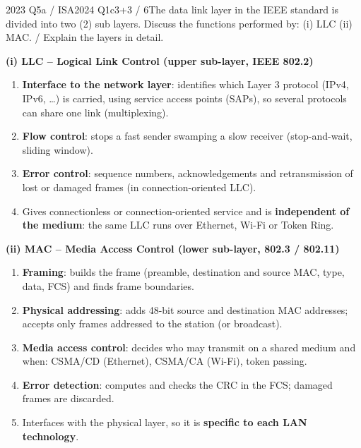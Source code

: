 \documentclass[10pt]{article}
\begin{document}
\begin{pastq}{2023 Q5a \textnormal{/} ISA2024 Q1c}{3+3 / 6}The data link layer in the IEEE standard is divided into two (2) sub layers. Discuss the functions performed by: (i) LLC (ii) MAC. / Explain the layers in detail.\end{pastq}
\begin{ans}
\textbf{(i) LLC -- Logical Link Control (upper sub-layer, IEEE 802.2)}
\begin{enumerate}
\item \textbf{Interface to the network layer}: identifies which Layer 3 protocol (IPv4, IPv6, \dots) is carried, using service access points (SAPs), so several protocols can share one link (multiplexing).
\item \textbf{Flow control}: stops a fast sender swamping a slow receiver (stop-and-wait, sliding window).
\item \textbf{Error control}: sequence numbers, acknowledgements and retransmission of lost or damaged frames (in connection-oriented LLC).
\item Gives connectionless or connection-oriented service and is \textbf{independent of the medium}: the same LLC runs over Ethernet, Wi-Fi or Token Ring.
\end{enumerate}
\textbf{(ii) MAC -- Media Access Control (lower sub-layer, 802.3 / 802.11)}
\begin{enumerate}
\item \textbf{Framing}: builds the frame (preamble, destination and source MAC, type, data, FCS) and finds frame boundaries.
\item \textbf{Physical addressing}: adds 48-bit source and destination MAC addresses; accepts only frames addressed to the station (or broadcast).
\item \textbf{Media access control}: decides who may transmit on a shared medium and when: CSMA/CD (Ethernet), CSMA/CA (Wi-Fi), token passing.
\item \textbf{Error detection}: computes and checks the CRC in the FCS; damaged frames are discarded.
\item Interfaces with the physical layer, so it is \textbf{specific to each LAN technology}.
\end{enumerate}
\end{ans}

\end{document}
